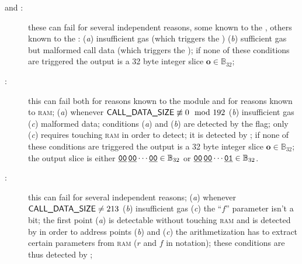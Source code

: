 \begin{description}
	\item[ and :]
		these can fail for several independent reasons, some known to the \hubMod{}, others known to the \mmuMod{}:
		(\emph{a}) insufficient gas (which triggers the \scenPrcFailureKnownToHub{})
		(\emph{b}) sufficient gas but malformed call data (which triggers the \scenPrcFailureKnownToRam{});
		if none of these conditions are triggered the output is a 32 byte integer slice $\textbf{o} \in \mathbb{B}_{32}$;
	\item[:]
		this can fail both for reasons known to the \hubMod{} module and for reasons known to \textsc{ram};
		(\emph{a}) whenever $\textsf{CALL\_DATA\_SIZE} \not\equiv 0 \mod 192$
		(\emph{b}) insufficient gas
		(\emph{c}) malformed data;
		conditions (\emph{a}) and (\emph{b}) are detected by the \scenPrcFailureKnownToHub{} flag;
		only (\emph{c}) requires touching \textsc{ram} in order to detect;
		it is detected by \scenPrcFailureKnownToRam{};
		if none of these conditions are triggered the output is a 32 byte integer slice $\textbf{o} \in \mathbb{B}_{32}$;
		the output slice is either
		$
		\underline{\texttt{00}}\,
		\underline{\texttt{00}} \cdots
		\underline{\texttt{00}} \in \mathbb{B}_{32}$
		or
		$
		\underline{\texttt{00}}\,
		\underline{\texttt{00}} \cdots
		\underline{\texttt{01}} \in \mathbb{B}_{32}$.
	\item[:]
		this can fail for several independent reasons;
		(\emph{a}) whenever $\textsf{CALL\_DATA\_SIZE} \neq 213$
		(\emph{b}) insufficient gas
		(\emph{c}) the ``$f$'' parameter isn't a bit;
		the first point (\emph{a}) is detectable without touching \textsc{ram} and is detected by \scenPrcFailureKnownToHub{} 
		in order to address points (\emph{b}) and (\emph{c}) the arithmetization has to extract certain parameters from \textsc{ram} ($r$ and $f$ in \cite{EYP} notation);
		these conditions are thus detected by \scenPrcFailureKnownToRam{};
\end{description}
